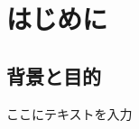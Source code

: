 \documentclass[a4paper,10.5pt]{jsreport}
\begin{document}
\chapter{はじめに}
\section{背景と目的}
ここにテキストを入力\cite{book,online,article}
\end{document}
